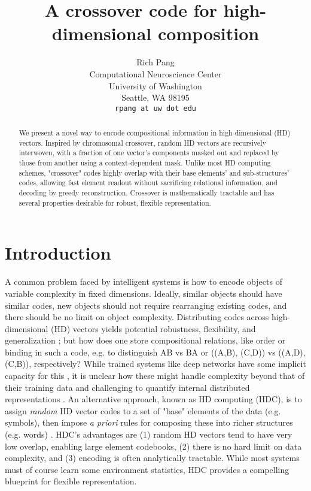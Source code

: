 \documentclass{article}
\title{A crossover code for high-dimensional composition}
\author{%
  Rich Pang\\
  Computational Neuroscience Center\\
  University of Washington\\
  Seattle, WA 98195\\
  \texttt{rpang at uw dot edu} \\
}
\begin{document}
\maketitle

\begin{abstract}
We present a novel way to encode compositional information in high-dimensional (HD) vectors. Inspired by chromosomal crossover, random HD vectors are recursively interwoven, with a fraction of one vector's components masked out and replaced by those from another using a context-dependent mask. Unlike most HD computing schemes, "crossover" codes highly overlap with their base elements' and sub-structures' codes, allowing fast element readout without sacrificing relational information, and decoding by greedy reconstruction. Crossover is mathematically tractable and has several properties desirable for robust, flexible representation.
\end{abstract}

\section{Introduction}

A common problem faced by intelligent systems is how to encode objects of variable complexity in fixed dimensions. Ideally, similar objects should have similar codes, new objects should not require rearranging existing codes, and there should be no limit on object complexity. Distributing codes across high-dimensional (HD) vectors yields potential robustness, flexibility, and generalization \cite{Hinton:1984, Mikolov:2013}; but how does one store compositional relations, like order or binding in such a code, e.g. to distinguish AB vs BA or ((A,B), (C,D)) vs ((A,D), (C,B)), respectively? While trained systems like deep networks have some implicit capacity for this \cite{Bahdanau:2014, Luong:2015, Wu:2016}, it is unclear how these might handle complexity beyond that of their training data and challenging to quantify internal distributed representations \cite{Lipton:2016}. An alternative approach, known as HD computing (HDC), is to assign \textit{random} HD vector codes to a set of "base" elements of the data (e.g. symbols), then impose \textit{a priori} rules for composing these into richer structures (e.g. words) \cite{Plate:1995, Kanerva:2009, Gayler:2004}. HDC's advantages are (1) random HD vectors tend to have very low overlap, enabling large element codebooks, (2) there is no hard limit on data complexity, and (3) encoding is often analytically tractable. While most systems must of course learn some environment statistics, HDC provides a compelling blueprint for flexible representation.
\end{document}
